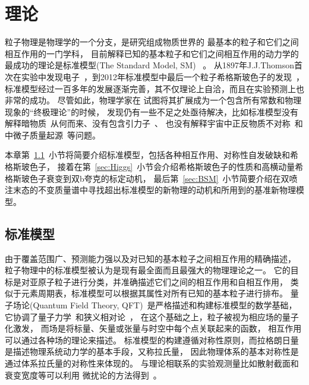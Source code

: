 
\chapter{理论}
\label{cha:Theory}

粒子物理是物理学的一个分支，是研究组成物质世界的
最基本的粒子和它们之间相互作用的一门学科，
目前解释已知的基本粒子和它们之间相互作用的动力学的
最成功的理论是标准模型(The Standard Model, SM)
~\cite{SM1,SM2,SM3,SM4,SM5,SM6,SM7,SMTALK,SM8,SMBOOK}。
从1897年J.J.Thomson首次在实验中发现电子~\cite{THOMSON}，到2012年标准模型中最后一个粒子希格斯玻色子的发现~\cite{ATLASHIGGS,CMSHIGGS}，
标准模型经过一百多年的发展逐渐完善，其不仅理论上自洽，而且在实验预测上也非常的成功。
尽管如此，物理学家在
试图将其扩展成为一个包含所有常数和物理现象的“终极理论”的时候，
发现仍有一些不足之处亟待解决，比如标准模型没有解释暗物质~\cite{DARKMATTER1,DARKMATTER2}从何而来、没有包含引力子~\cite{GRAVITON}、
也没有解释宇宙中正反物质不对称~\cite{ANTIMATTER}和中微子质量起源~\cite{NEUTRINO1,NEUTRINO2}等问题。

本章第~\ref{sec:SM}~小节将简要介绍标准模型，包括各种相互作用、对称性自发破缺和希格斯玻色子，
接着在第~\ref{sec:Higgs}~小节会介绍希格斯玻色子的性质和高横动量希格斯玻色子衰变到双b夸克的标定动机，
最后第~\ref{sec:BSM}~小节简要介绍在双喷注末态的不变质量谱中寻找超出标准模型的新物理的动机和所用到的基准新物理模型。

\section{标准模型}
\label{sec:SM}


由于覆盖范围广、预测能力强以及对已知的基本粒子之间相互作用的精确描述，
粒子物理中的标准模型被认为是现有最全面而且最强大的物理理论之一。
它的目标是对亚原子粒子进行分类，并准确描述它们之间的相互作用和自相互作用，
类似于元素周期表，标准模型可以根据其属性对所有已知的基本粒子进行排布。
量子场论(Quantum Field Theory, QFT)~\cite{QFT1}是严格描述和构建标准模型的数学基础，
它协调了量子力学~\cite{QMP}和狭义相对论~\cite{SRE}，
在这个基础之上，粒子被视为相应场的量子化激发，
而场是将标量、矢量或张量与时空中每个点关联起来的函数，
相互作用可以通过各种场的理论来描述。
标准模型的构建遵循对称性原则，而拉格朗日量是描述物理系统动力学的基本手段，又称拉氏量，
因此物理体系的基本对称性是通过体系拉氏量的对称性来体现的。
与理论相联系的实验观测量比如散射截面和衰变宽度等可以利用
微扰论的方法得到~\cite{QFT1}。

